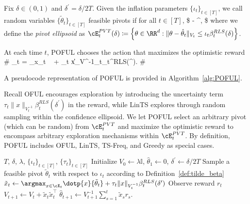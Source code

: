 \begin{definition} \label{def:tilde_beta}
Fix  $\delta \in (0,1)$ and  $\delta^\prime = \delta/2 T$. Given the inflation parameters $\{\iota_t\}_{t\in [T]}$, we call random variables $\{\tilde{\theta}_t\}_{t\in[T]}$  feasible pivots if for all $t\in[T]$,
\$
	\PP{}  - \delta^\prime,
	\$ where we define the \emph{pivot ellipsoid} as
$
 \cE_t^{\PVT} (\delta) \coloneqq \left \{\theta \in \RR^d: \|\theta - \hparam_t\|_{V_t}\leq \iota_t \beta^{RLS}_t (\delta ) \right\}$.
\end{definition}

At each time $t$, POFUL chooses the action that maximizes the optimistic reward \#\label{eq:POFUL}
_t = \argmax_{x\in\cX_t} \    +   \tau_t  \|x\|_{V^{-1}_t}\beta_t^{RLS}(\delta^\prime).
\#

A pseudocode representation of POFUL is provided in Algorithm~\ref{alg:POFUL}. 

Recall OFUL encourages exploration by introducing the uncertainty term $\tau_t  \|x\|_{V^{-1}_t}\beta_t^{RLS}(\delta^\prime)$ in the reward, while LinTS explores through random sampling within the confidence ellipsoid. We let POFUL select an arbitrary pivot (which can be random) from $\cE_t^{\PVT}$ and maximize the optimistic reward to encompass arbitrary exploration mechanisms within $\cE_t^{\PVT}$.    By definition, POFUL includes OFUL, LinTS, TS-Freq, and Greedy as special cases.

\begin{algorithm}
	\caption{POFUL }\label{alg:POFUL}
	\begin{algorithmic}
		\REQUIRE $T$, $\delta$, $\lambda$,  $\{\iota_t\}_{t\in [T]}$, $\{\tau_t\}_{t\in [T]}$
		\STATE Initialize $ V_{0} \leftarrow \lambda \mathbb{I}$, $\widehat{\theta}_{1} \leftarrow 0$,  $\delta^\prime \leftarrow \delta/2T$
		\STATE Sample a feasible pivot $\tilde{\theta}_{t} $ with respect to  $\iota_t$ according to Definition~\ref{def:tilde_beta}
		\STATE $\tilde{x}_{t} \leftarrow \argmax_{x\in\cX_t} \dotp{x}{\tilde{\theta}_{t}}  +   \tau_t  \|x\|_{V^{-1}_t}\beta_t^{RLS}(\delta^\prime)$
		\STATE Observe reward $r_{t}$
		\STATE $V_{t+1} \leftarrow V_{t}+\tilde{x}_{t}  \tilde{x}_{t}^{\top}$
		\STATE $\hat{\theta}_{t+1} \leftarrow V_{t+1}^{-1}\sum_{s=1}^{t} \tilde{x}_s r_{s}$.
		\ENDFOR
	\end{algorithmic}
\end{algorithm}







